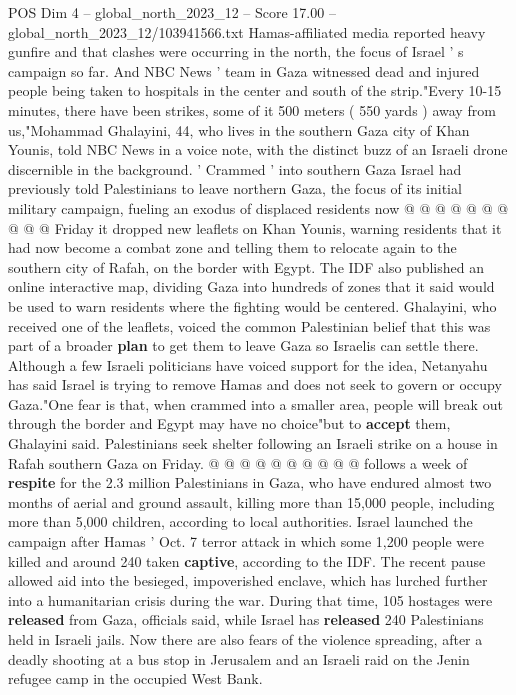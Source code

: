 \begin{textsample}{POS Dim 4 – global\_north\_2023\_12 – Score 17.00 – global\_north\_2023\_12/103941566.txt}
Hamas-affiliated media reported heavy gunfire and that clashes were occurring in the north, the focus of Israel ' s campaign so far.
And NBC News ' team in Gaza witnessed dead and injured people being taken to hospitals in the center and south of the strip."Every 10-15 minutes, there have been strikes, some of it 500 meters ( 550 yards ) away from us,"Mohammad Ghalayini, 44, who lives in the southern Gaza city of Khan Younis, told NBC News in a voice note, with the distinct buzz of an Israeli drone discernible in the background. ' Crammed ' into southern Gaza Israel had previously told Palestinians to leave northern Gaza, the focus of its initial military campaign, fueling an exodus of displaced residents now @ @ @ @ @ @ @ @ @ @ Friday it dropped new leaflets on Khan Younis, warning residents that it had now become a combat zone and telling them to relocate again to the southern city of Rafah, on the border with Egypt.
The IDF also published an online interactive map, dividing Gaza into hundreds of zones that it said would be used to warn residents where the fighting would be centered.
Ghalayini, who received one of the leaflets, voiced the common Palestinian belief that this was part of a broader \textbf{plan} to get them to leave Gaza so Israelis can settle there.
Although a few Israeli politicians have voiced support for the idea, Netanyahu has said Israel is trying to remove Hamas and does not seek to govern or occupy Gaza."One fear is that, when crammed into a smaller area, people will break out through the border and Egypt may have no choice"but to \textbf{accept} them, Ghalayini said.
Palestinians seek shelter following an Israeli strike on a house in Rafah southern Gaza on Friday. @ @ @ @ @ @ @ @ @ @ follows a week of \textbf{respite} for the 2.3 million Palestinians in Gaza, who have endured almost two months of aerial and ground assault, killing more than 15,000 people, including more than 5,000 children, according to local authorities.
Israel launched the campaign after Hamas ' Oct. 7 terror attack in which some 1,200 people were killed and around 240 taken \textbf{captive}, according to the IDF.
The recent pause allowed aid into the besieged, impoverished enclave, which has lurched further into a humanitarian crisis during the war.
During that time, 105 hostages were \textbf{released} from Gaza, officials said, while Israel has \textbf{released} 240 Palestinians held in Israeli jails.
Now there are also fears of the violence spreading, after a deadly shooting at a bus stop in Jerusalem and an Israeli raid on the Jenin refugee camp in the occupied West Bank.

\end{textsample}
